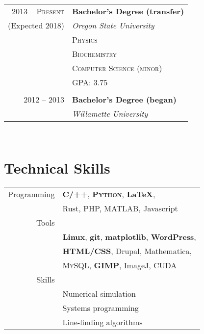 \documentclass[10pt]{article} %
\begin{document}
{\begin{minipage}[t]{0.44\textwidth}
\begin{tabular}{rl} %


2013 -- \textsc{Present} & \textbf{Bachelor's Degree (transfer)} \\
(Expected 2018)& \textit{Oregon State University}\\
& \textsc{Physics}\\
& \textsc{Biochemistry}\\
& \textsc{Computer Science (minor)}\\
& GPA: 3.75\\ \\

2012 -- 2013 & \textbf{Bachelor's Degree (began)} \\ 
& \textit{Willamette University}\\
	

\end{tabular}\\[10pt]


\section{Technical Skills} 

\begin{tabular}{rl}
  Programming
  & \textbf{\textsc{C/++}}, \textbf{\textsc{Python}}, \textbf{\LaTeX},\\
  & Rust, PHP, MATLAB, Javascript\\
  Tools\\
  & \textbf{Linux}, \textbf{git}, \textbf{matplotlib}, \textbf{WordPress},\\
  & \textbf{HTML/CSS}, Drupal, Mathematica,\\
  & \textsc{MySQL}, \textbf{GIMP}, ImageJ, CUDA\\
  Skills\\
  &Numerical simulation\\
  &Systems programming\\
  &Line-finding algorithms\\
\end{tabular}\\


\end{minipage}}
\end{document}
